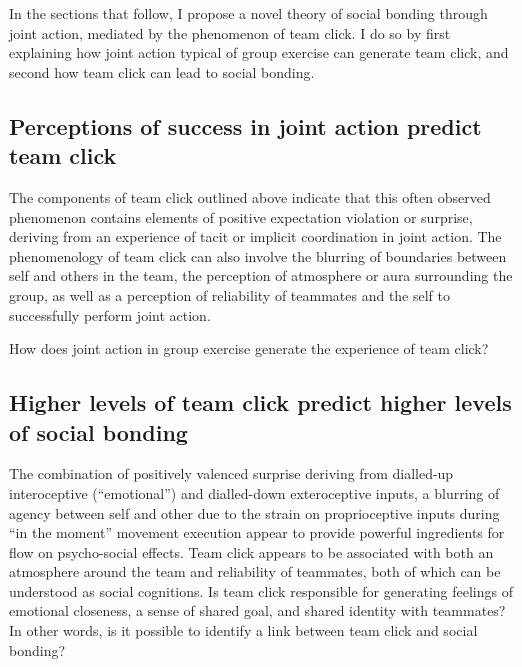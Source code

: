 \begin{CJK}{UTF8}{gbsn}
    In the sections that follow, I propose a novel theory of social bonding through joint action, mediated by the phenomenon of team click. I do so by first explaining how joint action typical of group exercise can generate team click, and second how team click can lead to social bonding.

    \subsection{Perceptions of success in joint action predict team click\label{sect:JASuccessTeamClick}}

    The components of team click outlined above indicate that this often observed phenomenon contains elements of positive expectation violation or surprise, deriving from an experience of tacit or implicit coordination in joint action.  The phenomenology of team click can also involve the blurring of boundaries between self and others in the team, the perception of atmosphere or aura surrounding the group, as well as a perception of reliability of teammates and the self to successfully perform joint action.

    How does joint action in group exercise generate the experience of team click?


    \subsection{Higher levels of team click predict higher levels of social bonding \label{sect:teamClickSocialBonding}}

    The combination of positively valenced surprise deriving from dialled-up interoceptive (``emotional'') and dialled-down exteroceptive inputs, a blurring of agency between self and other due to the strain on proprioceptive inputs during ``in the moment'' movement execution appear to provide powerful ingredients for flow on psycho-social effects.  Team click appears to be associated with both an atmosphere around the team and reliability of teammates, both of which can be understood as social cognitions.  Is team click responsible for generating feelings of emotional closeness, a sense of shared goal, and shared identity with teammates?  In other words, is it possible to identify a link between team click and social bonding?


\end{CJK}
